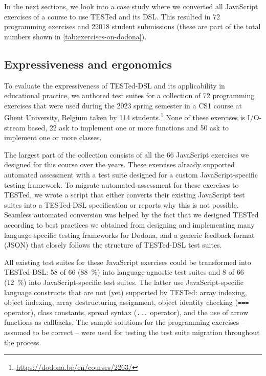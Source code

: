 \documentclass[../main]{subfiles}
\begin{document}
In the next sections, we look into a case study where we converted all JavaScript exercises of a course to use TESTed and its DSL\@.
This resulted in \num{72} programming exercises and \num{22018} student submissions (these are part of the total numbers shown in \vref{tab:exercises-on-dodona}).

\subsection{Expressiveness and ergonomics}\label{subsec:dsl-expressiveness-and-ergonomics}

To evaluate the expressiveness of TESTed-DSL and its applicability in educational practice, we authored test suites for a collection of \num{72} programming exercises that were used during the 2023 spring semester in a CS1 course at Ghent University, Belgium taken by \num{114} students.\footnote{\url{https://dodona.be/en/courses/2263/}}
None of these exercises is I/O-stream based, \num{22} ask to implement one or more functions and \num{50} ask to implement one or more classes.

The largest part of the collection consists of all the \num{66} JavaScript exercises we designed for this course over the years.
These exercises already supported automated assessment with a test suite designed for a custom JavaScript-specific testing framework.
To migrate automated assessment for these exercises to TESTed, we wrote a script that either converts their existing JavaScript test suites into a TESTed-DSL specification or reports why this is not possible.
Seamless automated conversion was helped by the fact that we designed TESTed according to best practices we obtained from designing and implementing many language-specific testing frameworks for Dodona, and a generic feedback format (JSON) that closely follows the structure of TESTed-DSL test suites.

All existing test suites for these JavaScript exercises could be transformed into TESTed-DSL: \num{58} of \num{66} (\qty{88}{\percent}) into language-agnostic test suites and \num{8} of \num{66} (\qty{12}{\percent}) into JavaScript-specific test suites.
The latter use JavaScript-specific language constructs that are not (yet) supported by TESTed: array indexing, object indexing, array destructuring assignment, object identity checking (\texttt{===} operator), class constants, spread syntax (\texttt{...} operator), and the use of arrow functions as callbacks.
The sample solutions for the programming exercises -- assumed to be correct -- were used for testing the test suite migration throughout the process.
\end{document}
